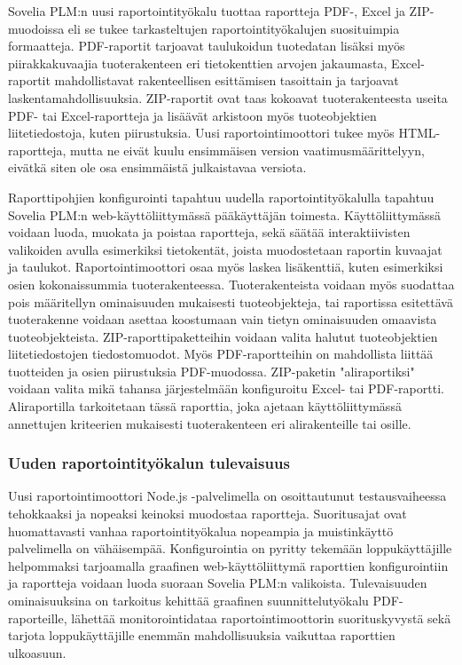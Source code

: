 
Sovelia PLM:n uusi raportointityökalu tuottaa raportteja PDF-, Excel ja ZIP-muodoissa eli se tukee tarkasteltujen raportointityökalujen suosituimpia formaatteja. PDF-raportit tarjoavat taulukoidun tuotedatan lisäksi myös piirakkakuvaajia tuoterakenteen eri tietokenttien arvojen jakaumasta, Excel-raportit mahdollistavat rakenteellisen esittämisen tasoittain ja tarjoavat laskentamahdollisuuksia. ZIP-raportit ovat taas kokoavat tuoterakenteesta useita PDF- tai Excel-raportteja ja lisäävät arkistoon myös tuoteobjektien liitetiedostoja, kuten piirustuksia. Uusi raportointimoottori tukee myös HTML-raportteja, mutta ne eivät kuulu ensimmäisen version vaatimusmäärittelyyn, eivätkä siten ole osa ensimmäistä julkaistavaa versiota.


Raporttipohjien konfigurointi tapahtuu uudella raportointityökalulla tapahtuu Sovelia PLM:n web-käyttöliittymässä pääkäyttäjän toimesta. Käyttöliittymässä voidaan luoda, muokata ja poistaa raportteja, sekä säätää interaktiivisten valikoiden avulla esimerkiksi tietokentät, joista muodostetaan raportin kuvaajat ja taulukot. Raportointimoottori osaa myös laskea lisäkenttiä, kuten esimerkiksi osien kokonaissummia tuoterakenteessa. Tuoterakenteista voidaan myös suodattaa pois määritellyn ominaisuuden mukaisesti tuoteobjekteja, tai raportissa esitettävä tuoterakenne voidaan asettaa koostumaan vain tietyn ominaisuuden omaavista tuoteobjekteista. ZIP-raporttipaketteihin voidaan valita halutut tuoteobjektien liitetiedostojen tiedostomuodot. Myös PDF-raportteihin on mahdollista liittää tuotteiden ja osien piirustuksia PDF-muodossa. ZIP-paketin "aliraportiksi" voidaan valita mikä tahansa järjestelmään konfiguroitu Excel- tai PDF-raportti. Aliraportilla tarkoitetaan tässä raporttia, joka ajetaan käyttöliittymässä annettujen kriteerien mukaisesti tuoterakenteen eri alirakenteille tai osille.


\subsubsection{Uuden raportointityökalun tulevaisuus}

Uusi raportointimoottori Node.js -palvelimella on osoittautunut testausvaiheessa tehokkaaksi ja nopeaksi keinoksi muodostaa raportteja. Suoritusajat ovat huomattavasti vanhaa raportointityökalua nopeampia ja muistinkäyttö palvelimella on vähäisempää. Konfigurointia on pyritty tekemään loppukäyttäjille helpommaksi tarjoamalla graafinen web-käyttöliittymä raporttien konfigurointiin ja raportteja voidaan luoda suoraan Sovelia PLM:n valikoista. Tulevaisuuden ominaisuuksina on tarkoitus kehittää graafinen suunnittelutyökalu PDF-raporteille, lähettää monitorointidataa raportointimoottorin suorituskyvystä sekä tarjota loppukäyttäjille enemmän mahdollisuuksia vaikuttaa raporttien ulkoasuun.

